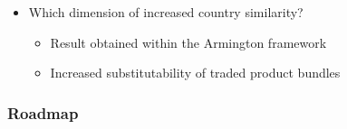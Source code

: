 \documentclass{beamer}
\begin{document}
\begin{frame}[plain]
\begin{itemize}
\begin{itemize}
\end{itemize}
\vspace{0.3cm}
\item Which dimension of increased country similarity? 
\begin{itemize}
\item Result obtained within the Armington framework 
\vspace{0.3cm}
\item Increased substitutability of traded product bundles 
\end{itemize}
\end{itemize}
\end{frame}

\begin{frame}[plain]\frametitle{Roadmap}\tableofcontents
\end{frame} 
\end{document}
